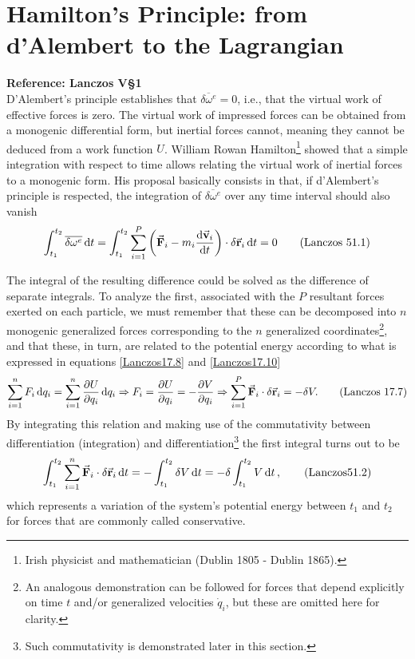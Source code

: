 \documentclass[12pt, spanish, a4paper, ]{article}
\begin{document}
\section{Hamilton's Principle: from d'Alembert to the Lagrangian}\label{principioHamilton}
\textbf{Reference: Lanczos V\S1}\\
 

D'Alembert's principle establishes that \(\overline{\delta \omega^e}= 0\), i.e., that the virtual work of effective forces is zero.
The virtual work of impressed forces can be obtained from a monogenic differential form, but inertial forces cannot, meaning they cannot be deduced from a work function \(U\).
William Rowan Hamilton\footnote{Irish physicist and mathematician (Dublin 1805 - Dublin 1865).} showed that a simple integration with respect to time allows relating the virtual work of inertial forces to a monogenic form.
His proposal basically consists in that, if d'Alembert's principle is respected, the integration of \(\overline{\delta \omega^e}\) over any time interval should also vanish
\begin{equation}\label{Lanczos51.1}
	\int^{t_2}_{t_1} \overline{\delta \omega^e} \dd{t}= \int^{t_2}_{t_1} \sum_{i=1}^P \pqty{ \va{F}_i - m_i \dv{\va{v}_i}{t} } \cdot \delta \va{r}_i \dd{t}= 0 
	\tag{Lanczos 51.1}
\end{equation}

The integral of the resulting difference could be solved as the difference of separate integrals.
To analyze the first, associated with the \(P\) resultant forces exerted on each particle, we must remember that these can be decomposed into \(n\) monogenic generalized forces corresponding to the \(n\) generalized coordinates\footnote{
    An analogous demonstration can be followed for forces that depend explicitly on time \(t\) and/or generalized velocities \(\dot{q}_i\), but these are omitted here for clarity.
}, and that these, in turn, are related to the potential energy according to what is expressed in equations \eqref{Lanczos17.8} and \eqref{Lanczos17.10} 
\begin{equation}\label{Lanczos17.7}
	\sum_{i=1}^n F_i \dd{q_i}= \sum_{i=1}^n \pdv{U}{q_i} \dd{q_i} \Rightarrow F_i= \pdv{U}{q_i}= - \pdv{V}{q_i} \Rightarrow \sum_{i=1}^P \va{F}_i \cdot \delta \va{r}_i = - \delta V.
	\tag{Lanczos 17.7}
\end{equation}
By integrating this relation and making use of the commutativity between differentiation (integration) and differentiation\footnote{Such commutativity is demonstrated later in this section.} the first integral turns out to be
\begin{equation}\label{Lanczos51.2}
	\int^{t_2}_{t_1} \sum_{i=1}^n \va{F}_i \cdot \delta \va{r}_i \dd{t} = - \int^{t_2}_{t_1} \delta V \dd{t}=
- \delta \int^{t_2}_{t_1} V \dd{t} ,
	\tag{Lanczos51.2}
\end{equation} 
which represents a variation of the system's potential energy between \(t_1\) and \(t_2\) for forces that are commonly called conservative.
\end{document}
